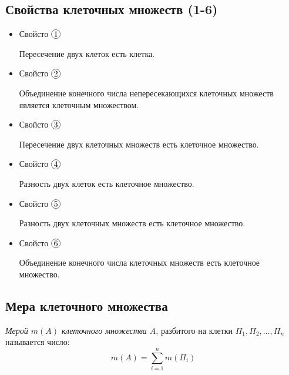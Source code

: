 \subsection{Свойства клеточных множеств (1-6)}

\begin{itemize}
    \item Свойсто $ \circled{1} $
          \begin{statement}
              Пересечение двух клеток есть клетка.
          \end{statement}

    \item Свойсто $ \circled{2} $
          \begin{statement}
              Объединение конечного числа непересекающихся клеточных множеств является клеточным множеством.
          \end{statement}

    \item Свойсто $ \circled{3} $
          \begin{statement}
              Пересечение двух клеточных множеств есть клеточное множество.
          \end{statement}

    \item Свойсто $ \circled{4} $
          \begin{statement}
              Разность двух клеток есть клеточное множество.
          \end{statement}

    \item Свойсто $ \circled{5} $
          \begin{statement}
              Разность двух клеточных множеств есть клеточное множество.
          \end{statement}

    \item Свойсто $ \circled{6} $
          \begin{statement}
              Объединение конечного числа клеточных множеств есть клеточное множество.
          \end{statement}
\end{itemize}

\subsection{Мера клеточного множества}

\begin{definition}
    \emph{Мерой $m(A)$ клеточного множества $A$}, разбитого на клетки $\Pi_1,\Pi_2,\ldots,\Pi_n$ называется число:
    \begin{equation}\label{eq:8.1.3}
        m(A) = \sum_{i=1}^{n}m(\Pi_i)
    \end{equation}
\end{definition}

